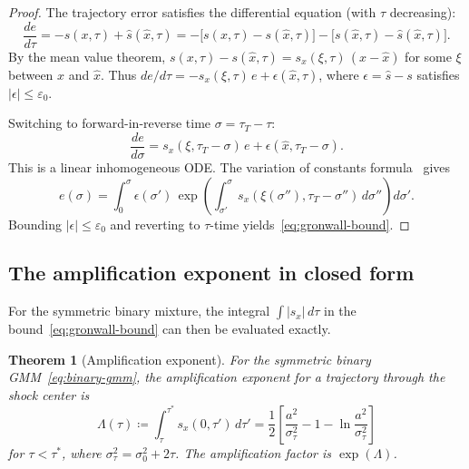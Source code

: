 \documentclass[11pt]{article}
\newtheorem{theorem}{Theorem}[section]
\begin{document}
\begin{proof}
The trajectory error satisfies the differential equation (with $\tau$ decreasing):
\begin{equation}\label{eq:error-ode}
  \frac{de}{d\tau}
  = -s(x,\tau) + \hat{s}(\hat{x},\tau)
  = -\bigl[s(x,\tau) - s(\hat{x},\tau)\bigr] - \bigl[s(\hat{x},\tau) - \hat{s}(\hat{x},\tau)\bigr].
\end{equation}
By the mean value theorem, $s(x,\tau) - s(\hat{x},\tau) = s_x(\xi,\tau)\,(x - \hat{x})$ for some $\xi$ between $x$ and $\hat{x}$.
Thus $de/d\tau = -s_x(\xi,\tau)\,e + \epsilon(\hat{x},\tau)$, where $\epsilon = \hat{s} - s$ satisfies $|\epsilon| \leq \varepsilon_0$.

Switching to forward-in-reverse time $\sigma = \tau_T - \tau$:
\begin{equation}\label{eq:error-forward}
  \frac{de}{d\sigma} = s_x(\xi, \tau_T - \sigma)\,e + \epsilon(\hat{x}, \tau_T - \sigma).
\end{equation}
This is a linear inhomogeneous ODE.
The variation of constants formula~\citep{gronwall1919note} gives
\[
  e(\sigma)
  = \int_0^\sigma \epsilon(\sigma')\,
    \exp\!\left(\int_{\sigma'}^\sigma s_x(\xi(\sigma''),\tau_T - \sigma'')\,d\sigma''\right) d\sigma'.
\]
Bounding $|\epsilon| \leq \varepsilon_0$ and reverting to $\tau$-time yields~\eqref{eq:gronwall-bound}.
\end{proof}

\subsection{The amplification exponent in closed form}\label{sec:amp:exponent}

For the symmetric binary mixture, the integral $\int |s_x|\,d\tau$ in the bound~\eqref{eq:gronwall-bound} can then be evaluated exactly.

\begin{theorem}[Amplification exponent]\label{thm:amplification}
For the symmetric binary GMM~\eqref{eq:binary-gmm}, the amplification exponent for a trajectory through the shock center is
\begin{equation}\label{eq:Lambda}
  \Lambda(\tau)
  \coloneqq \int_\tau^{\tau^\ast} s_x(0,\tau')\,d\tau'
  = \frac{1}{2}\!\left[\frac{a^2}{\sigma_\tau^2} - 1 - \ln\!\frac{a^2}{\sigma_\tau^2}\right]
\end{equation}
for $\tau < \tau^\ast$, where $\sigma_\tau^2 = \sigma_0^2 + 2\tau$.
The amplification factor is $\exp(\Lambda)$.
\end{theorem}
\end{document}
